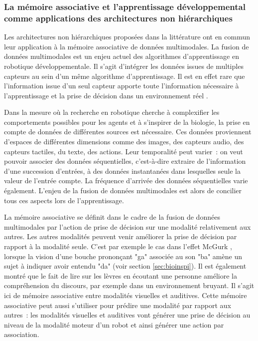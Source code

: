\documentclass[../main]{subfiles}
\begin{document}
\subsubsection{La mémoire associative et l'apprentissage développemental comme applications des architectures non hiérarchiques}

Les architectures non hiérarchiques proposées dans la littérature ont en commun leur application à la mémoire associative de données multimodales.
La fusion de données multimodales est un enjeu actuel des algorithmes d'apprentissage en robotique développementale.
Il s'agit d'intégrer les données issues de multiples capteurs au sein d'un même algorithme d'apprentissage.
Il est en effet rare que l'information issue d'un seul capteur apporte toute l'information nécessaire à l'apprentissage et la prise de décision dans un environnement réel \parencite{lahat2015}. 

Dans la mesure où la recherche en robotique cherche à complexifier les comportements possibles pour les agents et à s'inspirer de la biologie, la prise en compte de données de différentes sources est nécessaire. Ces données proviennent d'espaces de différentes dimensions comme des images, des capteurs audio, des capteurs tactiles, du texte, des actions. Leur temporalité peut varier~: on veut pouvoir associer des données séquentielles, c'est-à-dire extraire de l'information d'une succession d'entrées, à des données instantanées dans lesquelles seule la valeur de l'entrée compte. La fréquence d'arrivée des données séquentielles varie également.
L'enjeu de la fusion de données multimodales est alors de concilier tous ces aspects lors de l'apprentissage.

La mémoire associative se définit dans le cadre de la fusion de données multimodales par l'action de prise de décision sur une modalité relativement aux autres.
Les autres modalités peuvent venir améliorer la prise de décision par rapport à la modalité seule. C'est par exemple le cas dans l'effet McGurk \parencite{McGurk1976HearingLA}, lorsque la vision d'une bouche prononçant "ga" associée au son "ba" amène un sujet à indiquer avoir entendu "da" (voir section \ref{sec:bioinspi}). Il est également montré que le fait de lire sur les lèvres en écoutant une personne améliore la compréhension du discours, par exemple dans un environnement bruyant. Il s'agit ici de mémoire associative entre modalités visuelles et auditives.
Cette mémoire associative peut aussi s'utiliser pour prédire une modalité par rapport aux autres~: les modalités visuelles et auditives vont générer une prise de décision au niveau de la modalité moteur d'un robot et ainsi générer une action par association.
\end{document}
